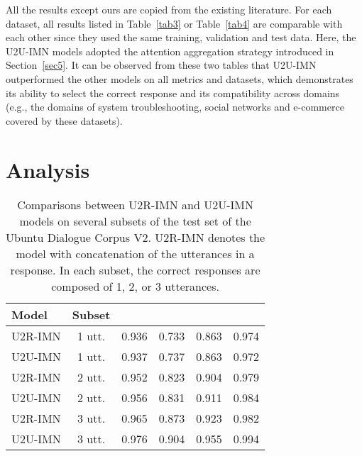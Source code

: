 \documentclass[journal]{IEEEtran}
\begin{document}
    All the results except ours are copied from the existing literature.
    For each dataset, all results listed in Table~\ref{tab3} or Table~\ref{tab4} are comparable with each other since they used the same training, validation and test data.
    Here, the U2U-IMN models adopted the attention aggregation strategy introduced in Section~\ref{sec5}.
    It can be observed from these two tables that U2U-IMN outperformed the other models on all metrics and datasets, which demonstrates its ability to select the correct response and its compatibility across domains (e.g., the domains of system troubleshooting, social networks and e-commerce covered by these datasets).


\section{Analysis}

 \begin{table}[hbt]
     \small
     \caption{Comparisons between U2R-IMN and U2U-IMN models on several subsets of the test set of the Ubuntu Dialogue Corpus V2. U2R-IMN denotes the model with concatenation of the utterances in a response. In each subset, the correct responses are composed of 1, 2, or 3 utterances.}
      \label{tab9}
     \centering
     \begin{tabular}{lccccc}
      \toprule
       Model            & Subset          &  &  &  & \\
      \midrule
       U2R-IMN & 1 utt.                           & 0.936 & 0.733 & 0.863 & 0.974  \\
       U2U-IMN & 1 utt.                           & 0.937 & 0.737 & 0.863 & 0.972  \\
       \midrule
       U2R-IMN & 2 utt.                           & 0.952 & 0.823 & 0.904 & 0.979  \\
       U2U-IMN & 2 utt.                           & 0.956 & 0.831 & 0.911 & 0.984  \\
       \midrule
       U2R-IMN & 3 utt.                           & 0.965 & 0.873 & 0.923 & 0.982  \\
       U2U-IMN & 3 utt.                           & 0.976 & 0.904 & 0.955 & 0.994  \\
      \bottomrule
      \end{tabular}
    \end{table}
\end{document}
